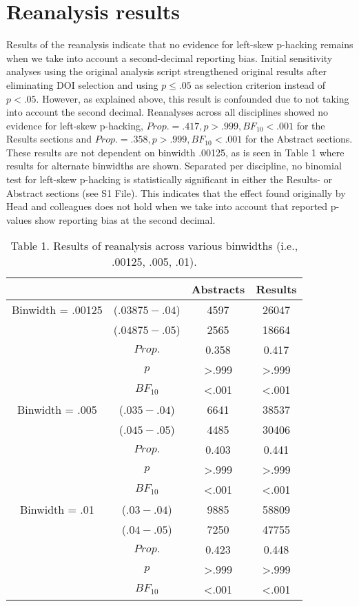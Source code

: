 \section*{Reanalysis results}
Results of the reanalysis indicate that no evidence for left-skew p-hacking remains when we take into account a second-decimal reporting bias. Initial sensitivity analyses using the original analysis script strengthened original results after eliminating DOI selection and using $p\leq.05$ as selection criterion instead of $p<.05$. However, as explained above, this result is confounded due to not taking into account the second decimal. Reanalyses across all disciplines showed no evidence for left-skew p-hacking, $Prop.=.417,p>.999, BF_{10}<.001$ for the Results sections and $Prop.=.358,p>.999,BF_{10}<.001$ for the Abstract sections. These results are not dependent on binwidth .00125, as is seen in Table 1 where results for alternate binwidths are shown.  Separated per discipline, no binomial test for left-skew p-hacking is statistically significant in either the Results- or Abstract sections (see S1 File). This indicates that the effect found originally by Head and colleagues does not hold when we take into account that reported p-values show reporting bias at the second decimal.

\begin{table}[htbp]
    \begin{tabular}{cccc}
              &       & Abstracts & Results \\
              \hline
      Binwidth = .00125 & ($.03875-.04$) & 4597  & 26047 \\
          & ($.04875-.05$) & 2565  & 18664 \\
          & $Prop.$ & 0.358 & 0.417 \\
          & $p$     & >.999 & >.999 \\
          & $BF_{10}$  & <.001 & <.001 \\
    Binwidth = .005 & ($.035-.04$) & 6641  & 38537 \\
          & ($.045-.05$) & 4485  & 30406 \\
          & $Prop.$ & 0.403 & 0.441 \\
          & $p$     & >.999 & >.999 \\
          & $BF_{10}$  & <.001 & <.001 \\
    Binwidth = .01 & ($.03-.04$) & 9885  & 58809 \\
          & ($.04-.05$) & 7250  & 47755 \\
          & $Prop.$ & 0.423 & 0.448 \\
          & $p$     & >.999 & >.999 \\
          & $BF_{10}$  & <.001 & <.001 \\

    \end{tabular}
    \caption{Table 1. Results of reanalysis across various binwidths (i.e., .00125, .005, .01).} 
\end{table}
  
  
